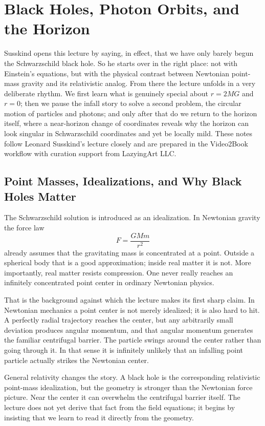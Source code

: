 \chapter{Black Holes, Photon Orbits, and the Horizon}

Susskind opens this lecture by saying, in effect, that we have only barely begun the Schwarzschild black hole. So he starts over in the right place: not with Einstein's equations, but with the physical contrast between Newtonian point-mass gravity and its relativistic analog. From there the lecture unfolds in a very deliberate rhythm. We first learn what is genuinely special about \(r=2MG\) and \(r=0\); then we pause the infall story to solve a second problem, the circular motion of particles and photons; and only after that do we return to the horizon itself, where a near-horizon change of coordinates reveals why the horizon can look singular in Schwarzschild coordinates and yet be locally mild. These notes follow Leonard Susskind's lecture closely and are prepared in the Video2Book workflow with curation support from LazyingArt LLC.

\section{Point Masses, Idealizations, and Why Black Holes Matter}

The Schwarzschild solution is introduced as an idealization. In Newtonian gravity the force law
\begin{equation}
F=\frac{GMm}{r^{2}}
\end{equation}
already assumes that the gravitating mass is concentrated at a point. Outside a spherical body that is a good approximation; inside real matter it is not. More importantly, real matter resists compression. One never really reaches an infinitely concentrated point center in ordinary Newtonian physics.

That is the background against which the lecture makes its first sharp claim. In Newtonian mechanics a point center is not merely idealized; it is also hard to hit. A perfectly radial trajectory reaches the center, but any arbitrarily small deviation produces angular momentum, and that angular momentum generates the familiar centrifugal barrier. The particle swings around the center rather than going through it. In that sense it is infinitely unlikely that an infalling point particle actually strikes the Newtonian center.

General relativity changes the story. A black hole is the corresponding relativistic point-mass idealization, but the geometry is stronger than the Newtonian force picture. Near the center it can overwhelm the centrifugal barrier itself. The lecture does not yet derive that fact from the field equations; it begins by insisting that we learn to read it directly from the geometry.


